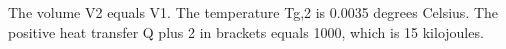 The volume V2 equals V1. The temperature Tg,2 is 0.0035 degrees Celsius. The positive heat transfer Q plus 2 in brackets equals 1000, which is 15 kilojoules.